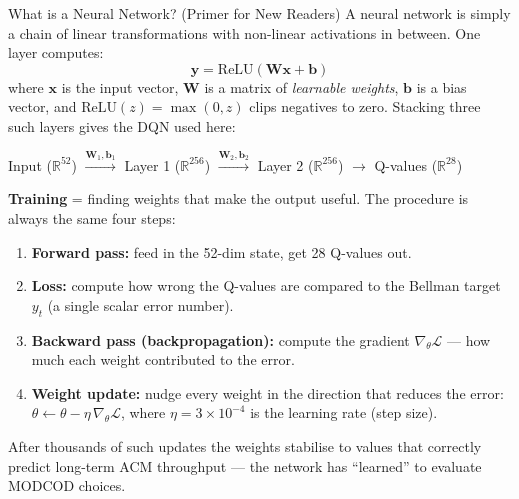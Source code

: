 \documentclass[12pt,a4paper]{report}
\begin{document}
\begin{conceptbox}{What is a Neural Network? (Primer for New Readers)}
A neural network is simply a chain of linear transformations with non-linear
activations in between.  One layer computes:
\[
  \mathbf{y} = \mathrm{ReLU}(\mathbf{W}\mathbf{x} + \mathbf{b})
\]
where $\mathbf{x}$ is the input vector, $\mathbf{W}$ is a matrix of
\emph{learnable weights}, $\mathbf{b}$ is a bias vector, and
$\mathrm{ReLU}(z) = \max(0,z)$ clips negatives to zero.  Stacking three
such layers gives the DQN used here:

\smallskip
\centerline{Input ($\mathbb{R}^{52}$) $\xrightarrow{\mathbf{W}_1,\mathbf{b}_1}$
Layer 1 ($\mathbb{R}^{256}$) $\xrightarrow{\mathbf{W}_2,\mathbf{b}_2}$
Layer 2 ($\mathbb{R}^{256}$) $\xrightarrow{}$ Q-values ($\mathbb{R}^{28}$)}
\smallskip

\textbf{Training} = finding weights that make the output useful.  The
procedure is always the same four steps:
\begin{enumerate}[nosep,leftmargin=*]
  \item \textbf{Forward pass:} feed in the 52-dim state, get 28 Q-values out.
  \item \textbf{Loss:} compute how wrong the Q-values are compared to the
        Bellman target $y_t$ (a single scalar error number).
  \item \textbf{Backward pass (backpropagation):} compute the gradient
        $\nabla_\theta\mathcal{L}$ --- how much each weight contributed to the error.
  \item \textbf{Weight update:} nudge every weight in the direction that
        reduces the error: $\theta \leftarrow \theta - \eta\,\nabla_\theta\mathcal{L}$,
        where $\eta = 3\times10^{-4}$ is the learning rate (step size).
\end{enumerate}
After thousands of such updates the weights stabilise to values that
correctly predict long-term ACM throughput --- the network has ``learned''
to evaluate MODCOD choices.
\end{conceptbox}
\end{document}
